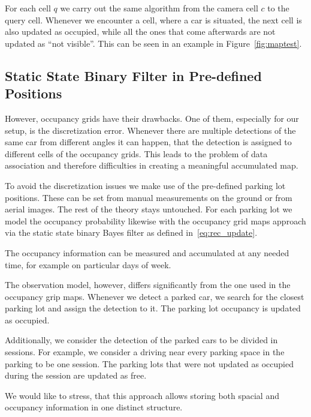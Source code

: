For each cell $q$ we carry out the same algorithm from the camera cell $c$ to
the query cell. Whenever we encounter a cell, where a car is situated, the
next cell is also updated as occupied, while all the ones that come afterwards
are not updated as ``not visible''. This can be seen in an example in
Figure~\ref{fig:maptest}.

\subsection{Static State Binary Filter in Pre-defined Positions}
\label{sub:static_state_binary_filter_in_pre_defined_positions}

However, occupancy grids have their drawbacks. One of them, especially for our
setup, is the discretization error. Whenever there are multiple detections of
the same car from different angles it can happen, that the detection is
assigned to different cells of the occupancy grids. This leads to the problem
of data association and therefore difficulties in creating a meaningful
accumulated map.

To avoid the discretization issues we make use of the pre-defined parking lot
positions. These can be set from manual measurements on the ground or from
aerial images. The rest of the theory stays untouched. For each parking lot we
model the occupancy probability likewise with the occupancy grid maps approach
via the static state binary Bayes filter as defined in~\eqref{eq:rec_update}.

The occupancy information can be measured and accumulated at any needed time,
for example on particular days of week.

The observation model, however, differs significantly from the one used in the
occupancy grip maps. Whenever we detect a parked car, we search for the
closest parking lot and assign the detection to it. The parking lot occupancy
is updated as occupied.

Additionally, we consider the detection of the parked cars to be divided in
sessions. For example, we consider a driving near every parking space in the
parking to be one session. The parking lots that were not updated as occupied
during the session are updated as free.

We would like to stress, that this approach allows storing both spacial and
occupancy information in one distinct structure.


